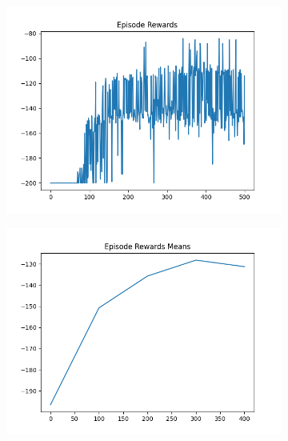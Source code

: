 \begin{figure}[H]
    \centering
    \begin{subfigure}{.47\linewidth}
        \centering
        \includegraphics[width=\textwidth]{mountain/2024-06-15_12-35-51_dqn_mountaincar_episode_rewards.png}
    \end{subfigure}
    \begin{subfigure}{.47\linewidth}
        \centering
        \includegraphics[width=\textwidth]{mountain/2024-06-15_12-35-51_dqn_mountaincar_episode_rewards_means.png}
    \end{subfigure}
    \begin{subfigure}{.47\linewidth}
        \centering

\end{subfigure}
\end{figure}
